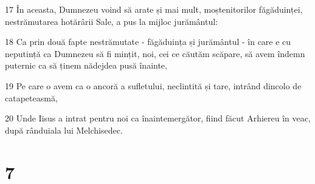 \par 17 În aceasta, Dumnezeu voind să arate și mai mult, moștenitorilor făgăduinței, nestrămutarea hotărârii Sale, a pus la mijloc jurământul:
\par 18 Ca prin două fapte nestrămutate - făgăduința și jurământul - în care e cu neputință ca Dumnezeu să fi mințit, noi, cei ce căutăm scăpare, să avem îndemn puternic ca să ținem nădejdea pusă înainte,
\par 19 Pe care o avem ca o ancoră a sufletului, neclintită și tare, intrând dincolo de catapeteasmă,
\par 20 Unde Iisus a intrat pentru noi ca înaintemergător, fiind făcut Arhiereu în veac, după rânduiala lui Melchisedec.

\chapter{7}

